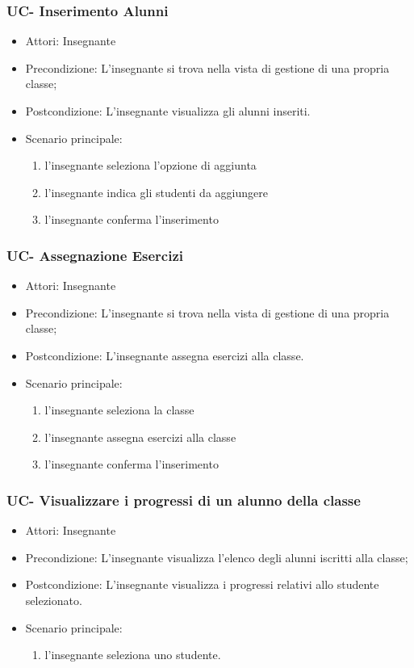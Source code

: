 \subsubsection{UC- Inserimento Alunni}
\begin{itemize}
	\item Attori: Insegnante
	\item Precondizione: L'insegnante si trova nella vista di gestione di una propria classe;
	\item Postcondizione: L'insegnante visualizza gli alunni inseriti.
	\item Scenario principale:
	\begin{enumerate}
		\item l'insegnante seleziona l'opzione di aggiunta
		\item l'insegnante indica gli studenti da aggiungere
		\item l'insegnante conferma l'inserimento
	\end{enumerate}
\end{itemize}

\subsubsection{UC- Assegnazione Esercizi}
\begin{itemize}
	\item Attori: Insegnante
	\item Precondizione: L'insegnante si trova nella vista di gestione di una propria classe;
	\item Postcondizione: L'insegnante assegna esercizi alla classe.
	\item Scenario principale:
	\begin{enumerate}
		\item l'insegnante seleziona la classe
		\item l'insegnante assegna esercizi alla classe
		\item l'insegnante conferma l'inserimento
	\end{enumerate}
\end{itemize}



\subsubsection{UC- Visualizzare i progressi di un alunno della
	classe}
\begin{itemize}
	\item Attori: Insegnante
	\item Precondizione: L'insegnante visualizza l'elenco degli alunni iscritti alla classe;
	\item Postcondizione: L'insegnante visualizza i progressi relativi allo studente selezionato.
	\item Scenario principale:
	\begin{enumerate}
		\item l'insegnante seleziona uno studente. 
	\end{enumerate}
\end{itemize}

